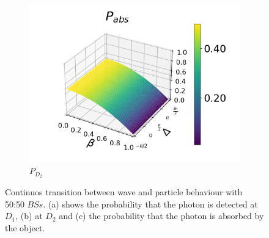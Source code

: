 \documentclass[12pt]{book}
\begin{document}
\begin{figure}[t!]
\begin{subfigure}[b]{0.40\linewidth}
\includegraphics[width=\linewidth]{images/pabs_2.png}
\caption{$P_{D_{2}}$ }
\label{fig:BS1}
\end{subfigure}
\caption{Continuos transition between wave and particle behaviour with 50:50 $BSs$. (a) shows the probability that the photon is detected at $D_{1}$, (b) at $D_{2}$ and (c) the probability  that the photon is absorbed by the object.}
\label{transzuri}
\end{figure}
\end{document}
